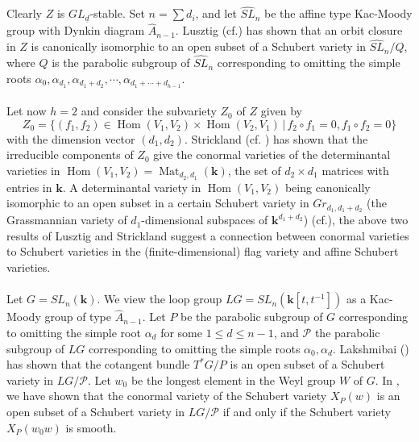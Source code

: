 \documentclass[paper=a4, fontsize=10pt]{amsart} %
\theoremstyle{plain}
\theoremstyle{definition}
\theoremstyle{remark}
\numberwithin{equation}{section} %
\numberwithin{figure}{section} %
\numberwithin{table}{section} %
\numberwithin{subsection}{section} %
\def\gl{\ensuremath{G}}
\def\gL{\ensuremath{L\gl}}
\def\gLhat{\gL}
\def\Para{\ensuremath{\mathcal P}}
\begin{document}
Clearly $Z$ is $GL_{{\underline d}}$-stable. 
Set $n=\sum d_i$, and let $\widehat{SL}_n$ be the affine type Kac-Moody group with Dynkin diagram $\widehat A_{n-1}$.
Lusztig (cf.\cite{gl}) has shown that an orbit closure in $Z$ is canonically isomorphic to an open subset of a Schubert variety in ${\widehat{SL}}_n/Q$, where $Q$ is the parabolic subgroup of ${\widehat{SL}}_n$ corresponding to omitting the simple roots $\alpha_0,\alpha_{d_{1}}, \alpha_{d_{1}+d_{2}},\cdots,\alpha_{d_{1}+\cdots +d_{h-1}}$.
\\
\\
Let now $h=2$ and consider the subvariety $Z_0$ of $Z$ given by
$$Z_0=\{(f_1,f_2)\in \operatorname{Hom}(V_1,V_2)\times\operatorname{Hom}(V_2,V_1)\,|\,f_2\circ f_1=0,f_1\circ f_2=0\}$$
with the dimension vector $(d_1,d_2)$.
Strickland (cf. \cite{strickland}) has shown that the irreducible components of $Z_0$ give the conormal varieties of the determinantal varieties in $\operatorname{Hom}(V_1,V_2)=\operatorname{Mat}_{d_2,d_1}(\mathbf k)$, the set of $d_2\times d_1$ matrices with entries in $\mathbf k$.
%
A determinantal variety in $\operatorname{Hom}(V_1,V_2)$ being canonically isomorphic to an open subset in a certain
Schubert variety in $Gr_{d_1,d_1+d_2}$ (the Grassmannian variety of $d_1$-dimensional subspaces of $\mathbf k^{d_1+d_2}$) (cf.\cite{gp2}),
the above two results of Lusztig and Strickland suggest a connection between conormal varieties to Schubert varieties in the (finite-dimensional) flag variety and affine Schubert varieties. 
\\
\\
Let $\gl=SL_n(\mathbf k)$.
We view the loop group $\gLhat=SL_n\left(\mathbf k[t,t^{-1}]\right)$ as a Kac-Moody group of type $\widehat A_{n-1}$.
Let $P$ be the parabolic subgroup of $G$ corresponding to omitting the simple root $\alpha_d$ for some $1\leq d\leq n-1$, and $\Para$ the parabolic subgroup of $\gLhat$ corresponding to omitting the simple roots $\alpha_0,\alpha_d$.
Lakshmibai (\cite{vl}) has shown that the cotangent bundle $T^*G/P$ is an open subset of a Schubert variety in $\gLhat/\Para$.
Let $w_0$ be the longest element in the Weyl group $W$ of $G$.
In \cite{rv}, we have shown that the conormal variety of the Schubert variety $X_P(w)$ is an open subset of a Schubert variety in $\gLhat/\Para$ if and only if the Schubert variety $X_P(w_0w)$ is smooth.
\end{document}
